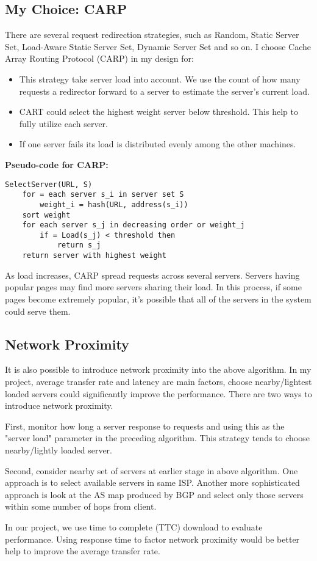 \documentclass{elegantpaper}
\begin{document}
\subsection{My Choice: CARP}
There are several request redirection strategies, such as Random, Static Server Set, Load-Aware Static Server Set, Dynamic Server Set and so on. I choose Cache Array Routing Protocol (CARP) in my design for:
\begin{itemize}[noitemsep]
	\item This strategy take server load into account. We use the count of how many requests a redirector forward to a server to estimate the server's current load.
	\item CART could select the highest weight server below threshold. This help to fully utilize each server.
	\item If one server fails its load is distributed evenly among the other machines.
\end{itemize}
\textbf{Pseudo-code for CARP:}
\begin{Verbatim}[tabsize=4,frame=single,baselinestretch=1]
SelectServer(URL, S)
	for = each server s_i in server set S
		weight_i = hash(URL, address(s_i))
	sort weight
	for each server s_j in decreasing order or weight_j
		if = Load(s_j) < threshold then
			return s_j
	return server with highest weight
\end{Verbatim}
As load increases, CARP spread requests across several servers. Servers having popular pages may find more servers sharing their load. In this process, if some pages become extremely popular, it's possible that all of the servers in the system could serve them.

\subsection{Network Proximity}
It is also possible to introduce network proximity into the above algorithm. In my project, average transfer rate and latency are main factors, choose nearby/lightest loaded servers could significantly improve the performance. There are two ways to introduce network proximity.

First, monitor how long a server response to requests and using this as the "server load" parameter in the preceding algorithm. This strategy tends to choose nearby/lightly loaded server.

Second, consider nearby set of servers at earlier stage in above algorithm. One approach is to select available servers in same ISP. Another more sophisticated approach is look at the AS map produced by BGP and select only those servers within some number of hops from client.

In our project, we  use time to complete (TTC) download to evaluate performance. Using response time to factor network proximity would be better help to improve the average transfer rate.





\end{document}

